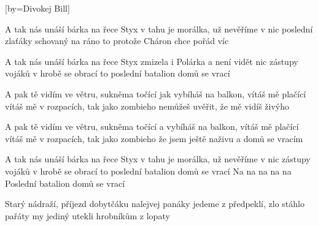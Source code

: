[by={Divokej Bill}]

\beginverse{}
A tak nás unáší bárka na řece Styx
v tahu je morálka, už nevěříme v nic
poslední zlaťáky schovaný na ráno
to protože Cháron chce pořád víc
\endverse{}

\beginverse{}
A tak nás unáší bárka na řece Styx
zmizela i Polárka a není vidět nic
zástupy vojáků v hrobě se obrací
to poslední batalion domů se vrací
\endverse{}

\beginverse*{}
               
\endverse{}

\beginverse{}
A pak tě vidím ve větru, sukněma točící
jak vybíháš na balkon, vítáš mě plačící
vítáš mě v rozpacích, tak jako zombieho
nemůžeš uvěřit, že mě vidíš živýho
\endverse{}

\beginverse{}
A pak tě vidím ve větru, sukněma točící
a vybíháš na balkon, vítáš mě plačící
vítáš mě v rozpacích, tak jako zombieho
že jsem ještě naživu a domů se vracím
\endverse{}

\beginverse*{}
               
\endverse{}

\beginverse{}
A tak nás unáší bárka na řece Styx
v tahu je morálka, už nevěříme v nic
zástupy vojáků v hrobě se obrací
to poslední batalion domů se vrací
Na na na na na
Poslední batalion domů se vrací
\endverse{}

\beginverse*{}
               
\endverse{}

\beginverse{}
Starý nádraží, příjezd dobytčáku
nalejvej panáky 
jedeme z předpeklí, zlo stáhlo pařáty
my jediný utekli hrobníkům z lopaty
\endverse{}

\endsong{}
